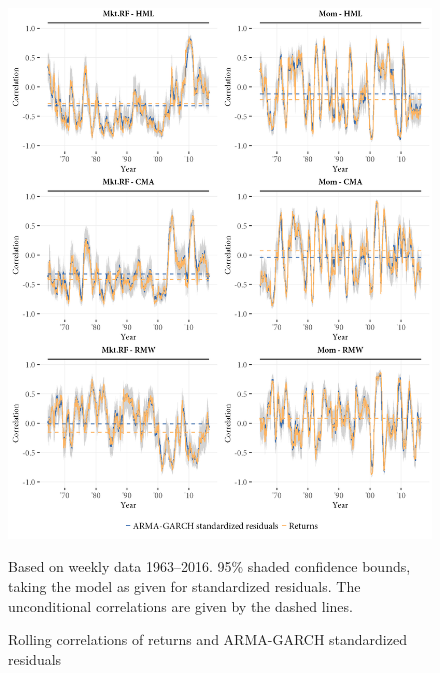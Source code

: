 \begin{figure}[!ht]
  \centering
  \footnotesize
  \includegraphics[scale=1]{graphics/appendix_rolling1.png}
  
  \caption{Rolling correlations of returns and ARMA-GARCH standardized residuals}
  \begin{longcaption}
    Based on weekly data 1963--2016. 95\% shaded confidence bounds, taking the model as given for standardized residuals. The unconditional correlations are given by the dashed lines.
  \end{longcaption}
  \label{fig:appendix_rolling1}
\end{figure}
